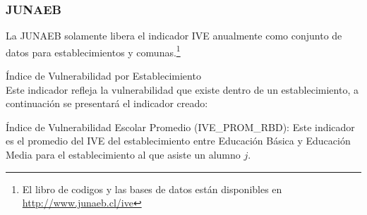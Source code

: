 \subsubsection{JUNAEB}
La JUNAEB solamente libera el indicador IVE anualmente como conjunto de datos para establecimientos y comunas.\footnote{El libro de codigos y las bases de datos están disponibles en\url{ http://www.junaeb.cl/ive}}
\begin{longdescription}
  \item[Índice de Vulnerabilidad por Establecimiento] \hfill \\
Este indicador refleja la vulnerabilidad que existe dentro de un establecimiento, a continuación se presentará el indicador creado:
    \begin{longdescription}
        \item[Índice de Vulnerabilidad Escolar Promedio](IVE\_PROM\_RBD): Este indicador es el promedio del IVE del establecimiento entre Educación Básica y Educación Media para el establecimiento al que asiste un alumno $j$.
    \end{longdescription}
\end{longdescription}